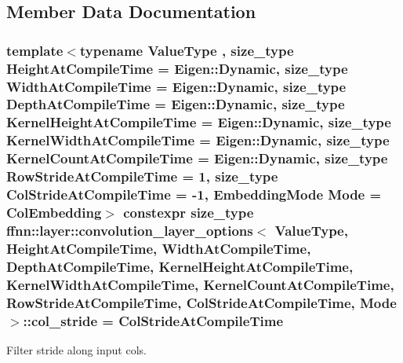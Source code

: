 \subsection{Member Data Documentation}
\hypertarget{structffnn_1_1layer_1_1convolution__layer__options_ae76e5f96d43c1f6fd36d5c763a549922}{
\subsubsection[{col\-\_\-stride}]{\setlength{\rightskip}{0pt plus 5cm}template$<$typename Value\-Type , size\-\_\-type Height\-At\-Compile\-Time = Eigen\-::\-Dynamic, size\-\_\-type Width\-At\-Compile\-Time = Eigen\-::\-Dynamic, size\-\_\-type Depth\-At\-Compile\-Time = Eigen\-::\-Dynamic, size\-\_\-type Kernel\-Height\-At\-Compile\-Time = Eigen\-::\-Dynamic, size\-\_\-type Kernel\-Width\-At\-Compile\-Time = Eigen\-::\-Dynamic, size\-\_\-type Kernel\-Count\-At\-Compile\-Time = Eigen\-::\-Dynamic, size\-\_\-type Row\-Stride\-At\-Compile\-Time = 1, size\-\_\-type Col\-Stride\-At\-Compile\-Time = -\/1, Embedding\-Mode Mode = Col\-Embedding$>$ constexpr {\bf size\-\_\-type} {\bf ffnn\-::layer\-::convolution\-\_\-layer\-\_\-options}$<$ Value\-Type, Height\-At\-Compile\-Time, Width\-At\-Compile\-Time, Depth\-At\-Compile\-Time, Kernel\-Height\-At\-Compile\-Time, Kernel\-Width\-At\-Compile\-Time, Kernel\-Count\-At\-Compile\-Time, Row\-Stride\-At\-Compile\-Time, Col\-Stride\-At\-Compile\-Time, Mode $>$\-::col\-\_\-stride = Col\-Stride\-At\-Compile\-Time\hspace{0.3cm}{\ttfamily [static]}}}\label{structffnn_1_1layer_1_1convolution__layer__options_ae76e5f96d43c1f6fd36d5c763a549922}


Filter stride along input cols. 

